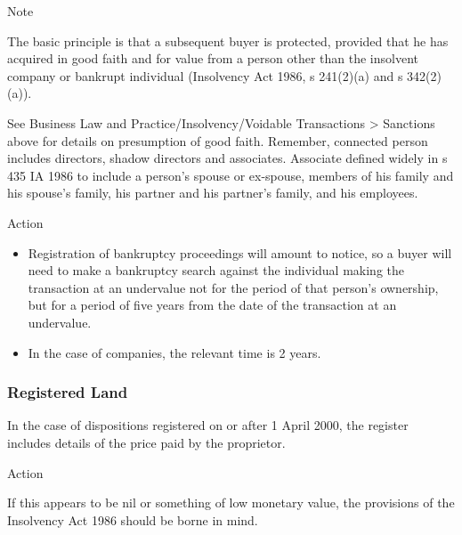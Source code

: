\documentclass[
]{article}
\providecommand{\tightlist}{%
  \setlength{\itemsep}{0pt}\setlength{\parskip}{0pt}}
\newenvironment{env-8e984a52-6a47-430d-9005-822950744b1a}
{
    \savenotes\tcolorbox[blanker,breakable,left=5pt,borderline west={2pt}{-4pt}{blue}]
}
{
    \endtcolorbox\spewnotes
}
\newenvironment{env-a1c35d52-c355-4524-93c6-325e9133bd60}
{
    \savenotes\tcolorbox[blanker,breakable,left=5pt,borderline west={2pt}{-4pt}{aquamarine}]
}
{
    \endtcolorbox\spewnotes
}
\begin{document}
\begin{env-8e984a52-6a47-430d-9005-822950744b1a}

Note

The basic principle is that a subsequent buyer is protected, provided
that he has acquired in good faith and for value from a person other
than the insolvent company or bankrupt individual (Insolvency Act 1986,
s 241(2)(a) and s 342(2)(a)).

\end{env-8e984a52-6a47-430d-9005-822950744b1a}

See Business Law and Practice/Insolvency/Voidable Transactions
\textgreater{} Sanctions above for details on presumption of good faith.
Remember, connected person includes directors, shadow directors and
associates. Associate defined widely in s 435 IA 1986 to include a
person's spouse or ex-spouse, members of his family and his spouse's
family, his partner and his partner's family, and his employees.

\begin{env-a1c35d52-c355-4524-93c6-325e9133bd60}

Action

\begin{itemize}
\tightlist
\item
  Registration of bankruptcy proceedings will amount to notice, so a
  buyer will need to make a bankruptcy search against the individual
  making the transaction at an undervalue not for the period of that
  person's ownership, but for a period of five years from the date of
  the transaction at an undervalue.
\item
  In the case of companies, the relevant time is 2 years.
\end{itemize}

\end{env-a1c35d52-c355-4524-93c6-325e9133bd60}

\hypertarget{registered-land}{%
\subsubsection{Registered Land}\label{registered-land}}

In the case of dispositions registered on or after 1 April 2000, the
register includes details of the price paid by the proprietor.

\begin{env-a1c35d52-c355-4524-93c6-325e9133bd60}

Action

If this appears to be nil or something of low monetary value, the
provisions of the Insolvency Act 1986 should be borne in mind.

\end{env-a1c35d52-c355-4524-93c6-325e9133bd60}
\end{document}
